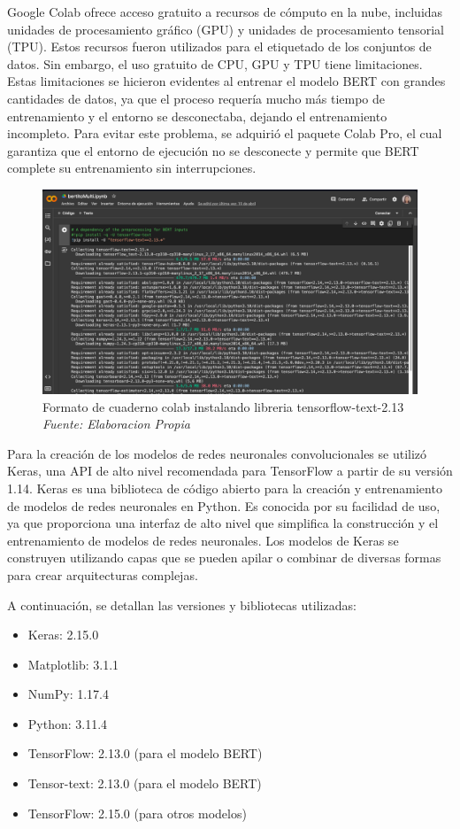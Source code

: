 Google Colab ofrece acceso gratuito a recursos de cómputo en la nube, incluidas unidades de procesamiento gráfico (GPU) y unidades de procesamiento tensorial (TPU). Estos recursos fueron utilizados para el etiquetado de los conjuntos de datos. Sin embargo, el uso gratuito de CPU, GPU y TPU tiene limitaciones. Estas limitaciones se hicieron evidentes al entrenar el modelo BERT con grandes cantidades de datos, ya que el proceso requería mucho más tiempo de entrenamiento y el entorno se desconectaba, dejando el entrenamiento incompleto. Para evitar este problema, se adquirió el paquete Colab Pro, el cual garantiza que el entorno de ejecución no se desconecte y permite que BERT complete su entrenamiento sin interrupciones.

\begin{figure}[h!]
	\includegraphics[width=1\textwidth]{capitulo5/figuras/bertito.png}
	\caption{Formato de cuaderno colab instalando libreria tensorflow-text-2.13
		\\\textit{Fuente: Elaboracion Propia}}
	\label{fig:bertito}
\end{figure}

Para la creación de los modelos de redes neuronales convolucionales se utilizó Keras, una API de alto nivel recomendada para TensorFlow a partir de su versión 1.14. Keras es una biblioteca de código abierto para la creación y entrenamiento de modelos de redes neuronales en Python. Es conocida por su facilidad de uso, ya que proporciona una interfaz de alto nivel que simplifica la construcción y el entrenamiento de modelos de redes neuronales. Los modelos de Keras se construyen utilizando capas que se pueden apilar o combinar de diversas formas para crear arquitecturas complejas.

A continuación, se detallan las versiones y bibliotecas utilizadas:

\begin{itemize}

\item Keras: 2.15.0
\item Matplotlib: 3.1.1
\item NumPy: 1.17.4
\item Python: 3.11.4
\item TensorFlow: 2.13.0 (para el modelo BERT)
\item Tensor-text: 2.13.0 (para el modelo BERT)
\item TensorFlow: 2.15.0 (para otros modelos)

\end{itemize}